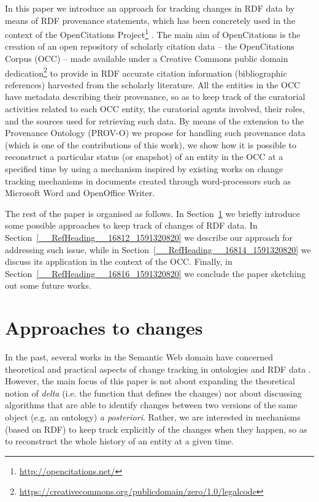 \documentclass[runningheads,a4paper]{llncs}
\begin{document}
In this paper we introduce an approach for tracking changes in RDF data by means of RDF provenance statements, which has been concretely used in the context of the OpenCitations Project\footnote{\url{http://opencitations.net/}} \cite{__RefNumPara__293_1852566440} \cite{__RefNumPara__17351_1591320820}. The main aim of OpenCitations is the creation of an open repository of scholarly citation data -- the OpenCitations Corpus (OCC) -- made available under a Creative Commons public domain dedication\footnote{\url{https://creativecommons.org/publicdomain/zero/1.0/legalcode}} to provide in RDF accurate citation information (bibliographic references) harvested from the scholarly literature. All the entities in the OCC have metadata describing their provenance, so as to keep track of the curatorial activities related to each OCC entity, the curatorial agents involved, their roles, and the sources used for retrieving such data. By means of the extension to the Provenance Ontology (PROV-O)  \cite{__RefNumPara__17349_1591320820} we propose for handling such provenance data (which is one of the contributions of this work), we show how it is possible to reconstruct a particular status (or snapshot) of an entity in the OCC at a specified time by using a mechanism inspired by existing works on change tracking mechanisms in documents created through word-processors such as Microsoft Word and OpenOffice Writer.

The rest of the paper is organised as follows. In Section~\ref{__RefHeading__16806_1591320820} we briefly introduce some possible approaches to keep track of changes of RDF data. In Section~\ref{__RefHeading__16812_1591320820} we describe our approach for addressing such issue, while in Section~\ref{__RefHeading__16814_1591320820} we discuss its application in the context of the OCC. Finally, in Section~\ref{__RefHeading__16816_1591320820} we conclude the paper sketching out some future works.

\section{Approaches to changes}\label{__RefHeading__16806_1591320820}

In the past, several works in the Semantic Web domain have concerned theoretical and practical aspects of change tracking in ontologies and RDF data  \cite{__RefNumPara__2072_1802243057} \cite{__RefNumPara__2076_1802243057} \cite{__RefNumPara__2074_1802243057}. However, the main focus of this paper is not about expanding the theoretical notion of {\em delta} (i.e. the function that defines the changes) nor about discussing algorithms that are able to identify changes between two versions of the same object (e.g. an ontology) {\em a posteriori}. Rather, we are interested in mechanisms (based on RDF) to keep track explicitly of the changes when they happen, so as to reconstruct the whole history of an entity at a given time.
\end{document}
